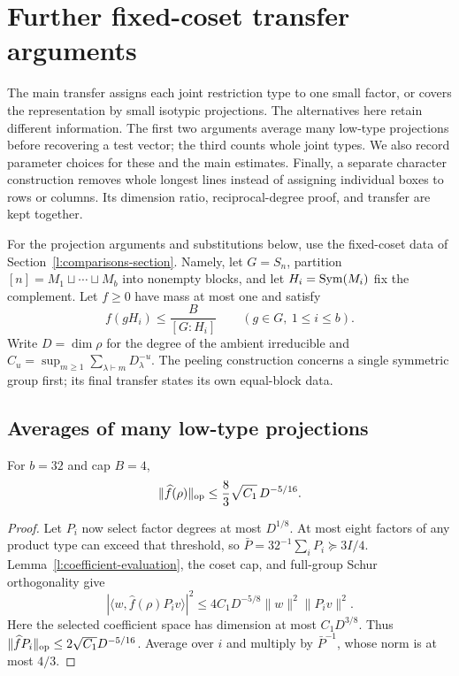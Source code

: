 \section{Further fixed-coset transfer arguments}
\label{l:transfer-supplement}

The main transfer assigns each joint restriction type to one small
factor, or covers the representation by small isotypic projections.
The alternatives here retain different information. The first two
arguments average many low-type projections before recovering a test
vector; the third counts whole joint types. We also record parameter
choices for these and the main estimates. Finally, a separate character
construction removes whole longest lines instead of assigning individual
boxes to rows or columns. Its dimension ratio, reciprocal-degree proof,
and transfer are kept together.

For the projection arguments and substitutions below, use the
fixed-coset data of Section~\ref{l:comparisons-section}. Namely, let
$G=S_n$, partition $[n]=M_1\sqcup\cdots\sqcup M_b$ into nonempty
blocks, and let $H_i=\operatorname{Sym}(M_i)$ fix the complement. Let $f\ge0$ have
mass at most one and satisfy
\[
 f(gH_i)\le \frac{B}{[G:H_i]}\qquad(g\in G,\ 1\le i\le b).
\]
Write $D=\dim\rho$ for the degree of the ambient irreducible and
$C_u=\sup_{m\ge1}\sum_{\lambda\vdash m}D_\lambda^{-u}$.
The peeling construction concerns a single symmetric group first;
its final transfer states its own equal-block data.

\subsection{Averages of many low-type projections}

\begin{proposition}\label{l:coefficient-average}
For $b=32$ and cap $B=4$,
\[
 \|\widehat f(\rho)\|_{\mathrm{op}}\le\frac83\sqrt{C_1}\,D^{-5/16}.
\]
\end{proposition}
\begin{proof}
Let $P_i$ now select factor degrees at most $D^{1/8}$. At most eight factors of any product type can exceed that threshold, so $\bar P=32^{-1}\sum_iP_i\succeq3I/4$. Lemma~\ref{l:coefficient-evaluation}, the coset cap, and full-group Schur orthogonality give
\[
 |\langle w,\widehat f(\rho)P_iv\rangle|^2
 \le4C_1D^{-5/8}\|w\|^2\|P_iv\|^2.
\]
Here the selected coefficient space has dimension at most $C_1D^{3/8}$. Thus $\|\widehat fP_i\|_{\mathrm{op}}\le2\sqrt{C_1}D^{-5/16}$. Average over $i$ and multiply by $\bar P^{-1}$, whose norm is at most $4/3$.
\end{proof}

